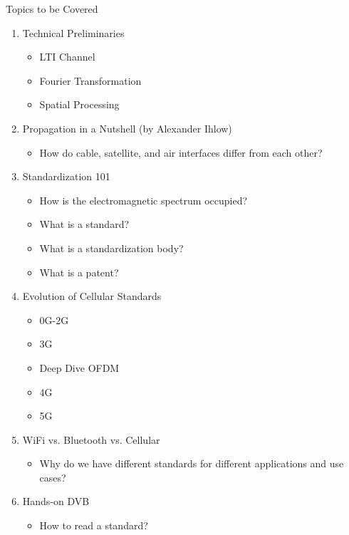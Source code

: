 \begin{frame}[allowframebreaks]{Topics to be Covered}
    \begin{enumerate}
        \item Technical Preliminaries
        \begin{itemize}
            \item LTI Channel
            \item Fourier Transformation
            \item Spatial Processing
        \end{itemize}
        \item Propagation in a Nutshell (by Alexander Ihlow)
        \begin{itemize}
            \item How do cable, satellite, and air interfaces differ from each other?
        \end{itemize}
        \item Standardization 101
        \begin{itemize}
            \item How is the electromagnetic spectrum occupied?
            \item What is a standard?
            \item What is a standardization body?
            \item What is a patent?
        \end{itemize}
        \item Evolution of Cellular Standards
        \begin{itemize}
            \item 0G-2G
            \item 3G
            \item Deep Dive OFDM
            \item 4G
            \item 5G
        \end{itemize}
        \framebreak
        \item WiFi vs. Bluetooth vs. Cellular
        \begin{itemize}
            \item Why do we have different standards for different applications and use cases?
        \end{itemize}
        \item Hands-on DVB
        \begin{itemize}
            \item How to read a standard?

\end{itemize}
\end{enumerate}
\end{frame}
